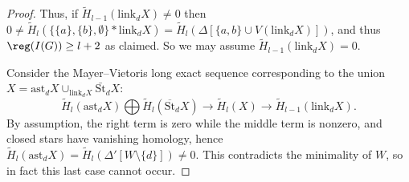\begin{proof}
Thus, if
$\widetilde{H}_{l-1}(\text{link}_d X)\neq 0$
then
$0\neq \widetilde{H}_l (\{\{a\},\{b\},\emptyset\}*\text{link}_d X)=\widetilde{H}_l(\Delta[\{a,b\}\cup V(\text{link}_d X)])$, and thus $\reg(I(G))\ge l+2$ as claimed. 
So we may assume $\widetilde{H}_{l-1}(\text{link}_d X)=0$.


Consider the Mayer--Vietoris long exact sequence
corresponding to the union
$X=\text{ast}_d X\cup_{\text{link}_d X} \bar{\text{St}}_d X$:
$$\widetilde{H}_l (\text{ast}_{d} X) \bigoplus \widetilde{H}_l (\overline{\text{St}}_{d} X) \longrightarrow \widetilde{H}_l (X) \longrightarrow \widetilde{H}_{l-1} (\text{link}_d X).$$
By assumption, the right term is zero while the middle term is nonzero, and closed stars have vanishing homology, hence
$\widetilde{H}_l (\text{ast}_{d} X)=
\widetilde{H}_l (\Delta'[W\setminus\{d\}])\neq 0$.
This contradicts the minimality of $W$, so in fact this last case cannot occur.
\end{proof}
